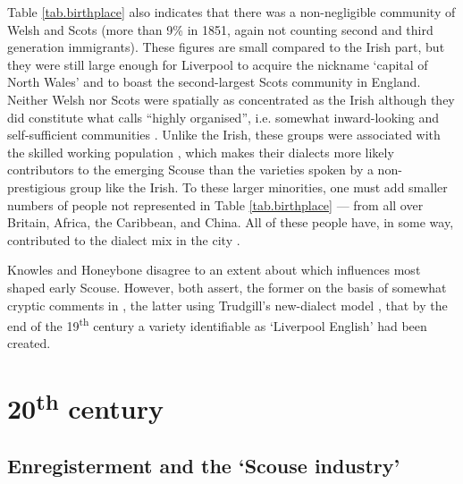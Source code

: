 Table \ref{tab.birthplace} also indicates that there was a non-negligible community of Welsh and Scots (more than 9\% in 1851, again not counting second and third generation immigrants).
These figures are small compared to the Irish part, but they were still large enough for Liverpool to acquire the nickname `capital of North Wales' and to boast the second-largest Scots community in England.
Neither Welsh nor Scots were spatially as concentrated as the Irish although they did constitute what \citeauthor{honeybone2007} calls ``highly organised'', i.e. somewhat inward-looking and self-sufficient communities \citep[cf.][120--121]{honeybone2007}.
Unlike the Irish, these groups were associated with the skilled working population \citep[cf.][202--203]{belchem2006b}, which makes their dialects more likely contributors to the emerging Scouse than the varieties spoken by a non-prestigious group like the Irish.
To these larger minorities, one must add smaller numbers of people not represented in Table \ref{tab.birthplace} --- from all over Britain, Africa, the Caribbean, and China.
All of these people have, in some way, contributed to the dialect mix in the city \citep[cf.][116]{honeybone2007}.

Knowles and Honeybone disagree to an extent about which influences most shaped early Scouse.
However, both assert, the former on the basis of somewhat cryptic comments in \citealt{ellis1889} \citep[cf.][18]{knowles1973}, the latter using Trudgill's new-dialect model \citep[cf.][118]{honeybone2007}, that by the end of the 19\textsuperscript{th} century a variety identifiable as `Liverpool English' had been created.

	\section{20\textsuperscript{th} century}\label{sec.hist.20}

		\subsection{Enregisterment and the `Scouse industry'}\label{sec.hist.20.industry}

